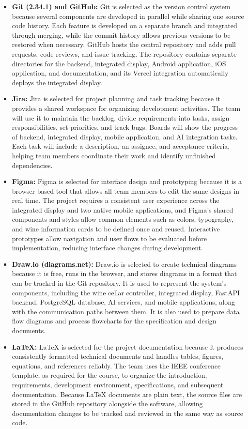 \documentclass[conference]{IEEEtran}
\begin{document}
\begin{itemize}
    \item \textbf{Git (2.34.1) and GitHub:} Git is selected as the version control system because several components are developed in parallel while sharing one source code history. Each feature is developed on a separate branch and integrated through merging, while the commit history allows previous versions to be restored when necessary. GitHub hosts the central repository and adds pull requests, code reviews, and issue tracking. The repository contains separate directories for the backend, integrated display, Android application, iOS application, and documentation, and its Vercel integration automatically deploys the integrated display.
    \item \textbf{Jira:} Jira is selected for project planning and task tracking because it provides a shared workspace for organizing development activities. The team will use it to maintain the backlog, divide requirements into tasks, assign responsibilities, set priorities, and track bugs. Boards will show the progress of backend, integrated display, mobile application, and AI integration tasks. Each task will include a description, an assignee, and acceptance criteria, helping team members coordinate their work and identify unfinished dependencies.
    \item \textbf{Figma:} Figma is selected for interface design and prototyping because it is a browser-based tool that allows all team members to edit the same designs in real time. The project requires a consistent user experience across the integrated display and two native mobile applications, and Figma's shared components and styles allow common elements such as colors, typography, and wine information cards to be defined once and reused. Interactive prototypes allow navigation and user flows to be evaluated before implementation, reducing interface changes during development.
    \item \textbf{Draw.io (diagrams.net):} Draw.io is selected to create technical diagrams because it is free, runs in the browser, and stores diagrams in a format that can be tracked in the Git repository. It is used to represent the system's components, including the wine cellar controller, integrated display, FastAPI backend, PostgreSQL database, AI services, and mobile applications, along with the communication paths between them. It is also used to prepare data flow diagrams and process flowcharts for the specification and design documents.
    \item \textbf{LaTeX:} LaTeX is selected for the project documentation because it produces consistently formatted technical documents and handles tables, figures, equations, and references reliably. The team uses the IEEE conference template, as required for the course, to organize the introduction, requirements, development environment, specifications, and subsequent documentation. Because LaTeX documents are plain text, the source files are stored in the GitHub repository alongside the software, allowing documentation changes to be tracked and reviewed in the same way as source code.
\end{itemize}
\end{document}
